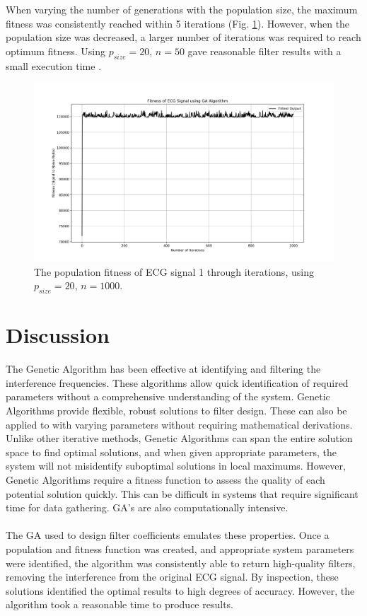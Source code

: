 \documentclass[a4paper, 11pt]{article}
\begin{document}
    When varying the number of generations with the population size, the maximum fitness was consistently reached within 5 
    iterations (Fig. \ref{Fig:result_2}). However, when the population size was decreased, a larger number of
    iterations was required to reach optimum fitness. Using $p_{size} = 20$, $n = 50$ gave reasonable filter results with a
    small execution time \cite[]{Garip2018}.

    \begin{figure}[h!]
        \centering
        \graphicspath{{./wiki/}}
        \includegraphics[scale=0.5]{1kGen20Pop.png}
        \caption{The population fitness of ECG signal 1 through iterations, using $p_{size} = 20$, $n = 1000$.}
        \label{Fig:result_2}
    \end{figure}

\section{Discussion}\label{sec:dis}
    The Genetic Algorithm has been effective at identifying and filtering the interference frequencies. These algorithms 
    allow quick identification of required parameters without a comprehensive understanding of the system. Genetic Algorithms 
    provide flexible, robust solutions to filter design. These can also be applied to with varying parameters without requiring
    mathematical derivations. Unlike other iterative methods, Genetic Algorithms can span the entire solution space to find
    optimal solutions, and when given appropriate parameters, the system will not misidentify suboptimal solutions in local
    maximums. However, Genetic Algorithms require a fitness function to assess the quality of each potential solution quickly. 
    This can be difficult in systems that require significant time for data gathering. GA's are also computationally intensive.
    \\\\
    The GA used to design filter coefficients emulates these properties. Once a population and fitness function was created,
    and appropriate system parameters were identified, the algorithm was consistently able to return high-quality filters, 
    removing the interference from the original ECG signal. By inspection, these solutions identified the optimal results to
    high degrees of accuracy. However, the algorithm took a reasonable time to produce results.
\end{document}

